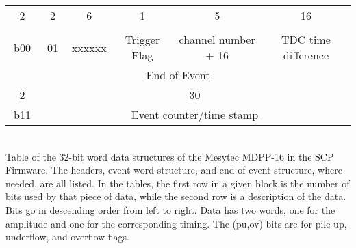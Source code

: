 \begin{landscape}
\begin{table}[]
\begin{tabular}{c|c|c|c|c|c|c|c|c|c|c|c|c|c|c|c|c|c|c|c|c|c|c|c|c|c|c|c|c|c|c|c}
        \hline
        \multicolumn{2}{c|}{2} & \multicolumn{2}{|c|}{2} & \multicolumn{6}{|c|}{6} & 1 & \multicolumn{5}{|c|}{5} & \multicolumn{16}{|c}{16}\\
        \addlinespace[-2ex]
        \multicolumn{2}{c|}{data-sig} & \multicolumn{2}{|c|}{} & \multicolumn{6}{|c|}{} &  & \multicolumn{5}{|c|}{} & \multicolumn{16}{|c}{}\\
        \hline
        \multicolumn{2}{c|}{b00} & \multicolumn{2}{|c|}{01} & \multicolumn{6}{|c|}{xxxxxx} & Trigger Flag & \multicolumn{5}{|c|}{channel number + 16} & \multicolumn{16}{|c}{TDC time difference}\\
        \midrule
        \multicolumn{32}{c}{End of Event} \\
        \hline
        \multicolumn{2}{c|}{2} & \multicolumn{30}{|c}{30}\\
        \hline
        \multicolumn{2}{c|}{b11} & \multicolumn{30}{|c}{Event counter/time stamp}\\
        \bottomrule
    \end{tabular}
    \\[2]
    \footnotesize
    Table of the 32-bit word data structures of the Mesytec MDPP-16 in the SCP Firmware. The headers, event word structure, and end of event structure, where needed, are all listed. In the tables, the first row in a given block is the number of bits used by that piece of data, while the second row is a description of the data. Bits go in descending order from left to right. Data has two words, one for the amplitude and one for the corresponding timing. The (pu,ov) bits are for pile up, underflow, and overflow flags.
\end{table}
\end{landscape}